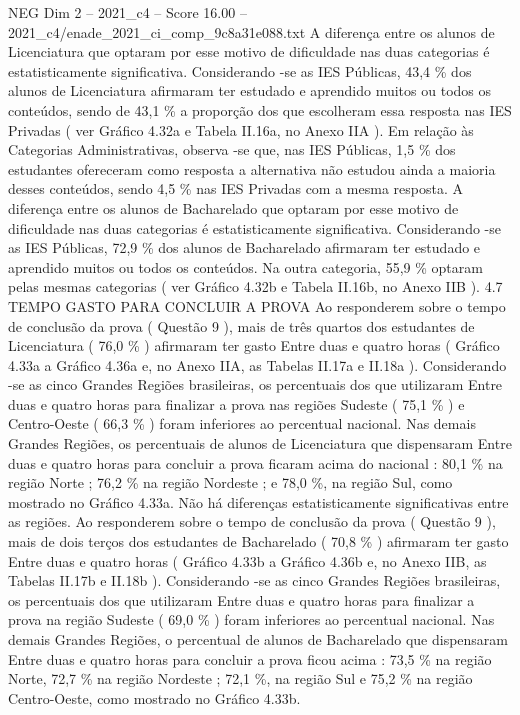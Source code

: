 \begin{textsample}{NEG Dim 2 – 2021\_c4 – Score 16.00 – 2021\_c4/enade\_2021\_ci\_comp\_9c8a31e088.txt}
A diferença entre os alunos de Licenciatura que optaram por esse motivo de dificuldade nas duas categorias é estatisticamente significativa.
Considerando -se as IES Públicas, 43,4 \% dos alunos de Licenciatura afirmaram ter estudado e aprendido muitos ou todos os conteúdos, sendo de 43,1 \% a proporção dos que escolheram essa resposta nas IES Privadas ( ver Gráfico 4.32a e Tabela II.16a, no Anexo IIA ).
Em relação às Categorias Administrativas, observa -se que, nas IES Públicas, 1,5 \% dos estudantes ofereceram como resposta a alternativa não estudou ainda a maioria desses conteúdos, sendo 4,5 \% nas IES Privadas com a mesma resposta.
A diferença entre os alunos de Bacharelado que optaram por esse motivo de dificuldade nas duas categorias é estatisticamente significativa.
Considerando -se as IES Públicas, 72,9 \% dos alunos de Bacharelado afirmaram ter estudado e aprendido muitos ou todos os conteúdos.
Na outra categoria, 55,9 \% optaram pelas mesmas categorias ( ver Gráfico 4.32b e Tabela II.16b, no Anexo IIB ). 4.7 TEMPO GASTO PARA CONCLUIR A PROVA Ao responderem sobre o tempo de conclusão da prova ( Questão 9 ), mais de três quartos dos estudantes de Licenciatura ( 76,0 \% ) afirmaram ter gasto Entre duas e quatro horas ( Gráfico 4.33a a Gráfico 4.36a e, no Anexo IIA, as Tabelas II.17a e II.18a ).
Considerando -se as cinco Grandes Regiões brasileiras, os percentuais dos que utilizaram Entre duas e quatro horas para finalizar a prova nas regiões Sudeste ( 75,1 \% ) e Centro-Oeste ( 66,3 \% ) foram inferiores ao percentual nacional.
Nas demais Grandes Regiões, os percentuais de alunos de Licenciatura que dispensaram Entre duas e quatro horas para concluir a prova ficaram acima do nacional : 80,1 \% na região Norte ; 76,2 \% na região Nordeste ; e 78,0 \%, na região Sul, como mostrado no Gráfico 4.33a.
Não há diferenças estatisticamente significativas entre as regiões.
Ao responderem sobre o tempo de conclusão da prova ( Questão 9 ), mais de dois terços dos estudantes de Bacharelado ( 70,8 \% ) afirmaram ter gasto Entre duas e quatro horas ( Gráfico 4.33b a Gráfico 4.36b e, no Anexo IIB, as Tabelas II.17b e II.18b ).
Considerando -se as cinco Grandes Regiões brasileiras, os percentuais dos que utilizaram Entre duas e quatro horas para finalizar a prova na região Sudeste ( 69,0 \% ) foram inferiores ao percentual nacional.
Nas demais Grandes Regiões, o percentual de alunos de Bacharelado que dispensaram Entre duas e quatro horas para concluir a prova ficou acima : 73,5 \% na região Norte, 72,7 \% na região Nordeste ; 72,1 \%, na região Sul e 75,2 \% na região Centro-Oeste, como mostrado no Gráfico 4.33b.

\end{textsample}
